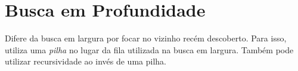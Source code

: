 
\section*{Busca em Profundidade}

Difere da busca em largura por focar no vizinho recém descoberto. Para isso, utiliza uma \emph{pilha} no lugar da fila utilizada na busca em largura. Também pode utilizar recursividade ao invés de uma pilha.

